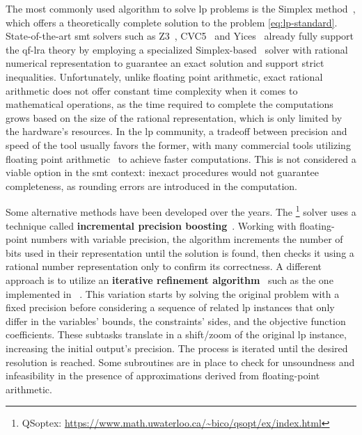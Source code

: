 \documentclass[runningheads]{llncs}
\begin{document}
The most commonly used algorithm to solve \gls{lp} problems is the Simplex method~\cite{dantzig1951maximization}, which offers a theoretically complete solution to the problem \eqref{eq:lp-standard}.
State-of-the-art \gls{smt} solvers such as Z3~\cite{ref:z3}, CVC5~\cite{ref:cvc5} and Yices~\cite{ref:yices} already fully support the \gls{qf-lra} theory
by employing a specialized Simplex-based~\cite{ref:lra-dpll-t} solver with rational numerical representation to guarantee an exact solution and support strict inequalities.
Unfortunately, unlike floating point arithmetic, exact rational arithmetic does not offer constant time complexity when it comes to mathematical operations,
as the time required to complete the computations grows based on the size of the rational representation, which is only limited by the hardware's resources.
In the \gls{lp} community, a tradeoff between precision and speed of the tool usually favors the former, with many commercial tools utilizing floating point arithmetic~\cite{ref:gurobi} to achieve faster computations.
This is not considered a viable option in the \gls{smt} context: inexact procedures would not guarantee completeness, as rounding errors are introduced in the computation.

Some alternative methods have been developed over the years.
The \qsoptex\footnote{QSoptex: \url{https://www.math.uwaterloo.ca/~bico/qsopt/ex/index.html}} solver uses a technique called \textbf{incremental precision boosting}~\cite{ref:precision-boosting}.
Working with floating-point numbers with variable precision, the algorithm increments the number of bits used in their representation until the solution is found, then checks it using a rational number representation only to confirm its correctness.
A different approach is to utilize an \textbf{iterative refinement algorithm}~\cite{ref:iterative-refinement} such as the one implemented in \soplex~\cite{ref:soplex}.
This variation starts by solving the original problem with a fixed precision before considering a sequence of related \gls{lp} instances that only differ in the variables' bounds, the constraints' sides, and the objective function coefficients.
These subtasks translate in a shift/zoom of the original \gls{lp} instance, increasing the initial output's precision.
The process is iterated until the desired resolution is reached.
Some subroutines are in place to check for unsoundness and infeasibility in the presence of approximations derived from floating-point arithmetic.
\end{document}
